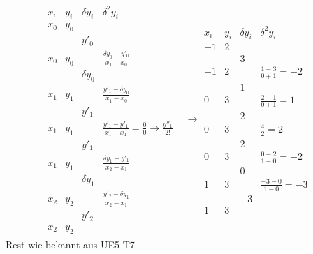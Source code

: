 \documentclass[10pt,a4paper]{article}
\begin{document}
	\begin{align*}
		\begin{array}{rr|llcc}
			x_i & y_i & \delta y_i & \delta^2 y_i &  \\ \hline
			x_0 & y_0 &            &  \\
			    &     & y'_0       &  \\
			x_0 & y_0 &            & \frac{\delta y_0-y'_0}{x_1-x_0} \\
			    &     & \delta y_0 &  \\
			x_1 & y_1 &            & \frac{y'_1 - \delta y_0}{x_1-x_0} \\
			    &     & y'_1       &  \\
			x_1 & y_1 &            & \frac{y'_1-y'_1}{x_1-x_1}=\frac{0}{0}\rightarrow \frac{y''_1}{2!} \\
			    &     & y'_1       &  \\
			x_1 & y_1 &            & \frac{\delta y_1-y'_1}{x_2-x_1} \\
			    &     & \delta y_1 &  \\
			x_2 & y_2 &            & \frac{y'_2 - \delta y_1}{x_2-x_1} \\
			    &     & y'_2       &  \\
			x_2 & y_2 &
		\end{array}
			\rightarrow
				\begin{array}{cc|rrcc}
					x_i & y_i &  \delta y_i  & \delta^2 y_i &  \\ \hline
					-1  &  2  &    &  \\
					    &     &  3 &  \\
					-1  &  2  &    & \frac{1-3}{0+1}=-2 \\
					    &     &  1 &  \\
					 0  &  3  &    & \frac{2-1}{0+1}=1 \\
					    &     &  2 &  \\
					 0  &  3  &    &  \frac{4}{2}=2 \\
					    &     &  2 &  \\
					 0  &  3  &    & \frac{0-2}{1-0}=-2 \\
					    &     &  0 &  \\
					 1  &  3  &    & \frac{-3-0}{1-0}=-3 \\
					    &     & -3 &  \\
					 1  &  3  &    &
				\end{array}
	\end{align*}
	Rest wie bekannt aus UE5 T7
\end{document}
